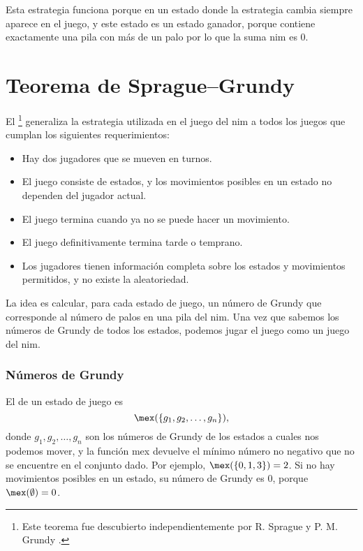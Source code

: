 Esta estrategia funciona porque en un estado donde la estrategia cambia
siempre aparece en el juego, y este estado es un estado ganador, porque
contiene exactamente una pila con más de un palo por lo que la suma nim
es 0.

\section{Teorema de Sprague--Grundy}


El \footnote{Este teorema fue descubierto
    independientemente por R. Sprague \cite{spr35} y P. M. Grundy \cite{gru39}.}
generaliza la estrategia utilizada en el juego del nim a todos los juegos
que cumplan los siguientes requerimientos:

\begin{itemize}[noitemsep]
    \item Hay dos jugadores que se mueven en turnos.
    \item El juego consiste de estados, y los movimientos posibles en
          un estado no dependen del jugador actual.
    \item El juego termina cuando ya no se puede hacer un movimiento.
    \item El juego definitivamente termina tarde o temprano.
    \item Los jugadores tienen información completa sobre los estados
          y movimientos permitidos, y no existe la aleatoriedad.
\end{itemize}

La idea es calcular, para cada estado de juego, un número de Grundy
que corresponde al número de palos en una pila del nim. Una vez que
sabemos los números de Grundy de todos los estados, podemos jugar el
juego como un juego del nim.

\subsubsection{Números de Grundy}


El  de un estado de juego es
\[\mex(\{g_1,g_2,\ldots,g_n\}),\] donde $g_1,g_2,\ldots,g_n$ son
los números de Grundy de los estados a cuales nos podemos mover,
y la función mex devuelve el mínimo número no negativo que no se
encuentre en el conjunto dado. Por ejemplo, $\mex(\{0,1,3\})=2$.
Si no hay movimientos posibles en un estado, su número de Grundy
es 0, porque $\mex(\emptyset)=0$.

